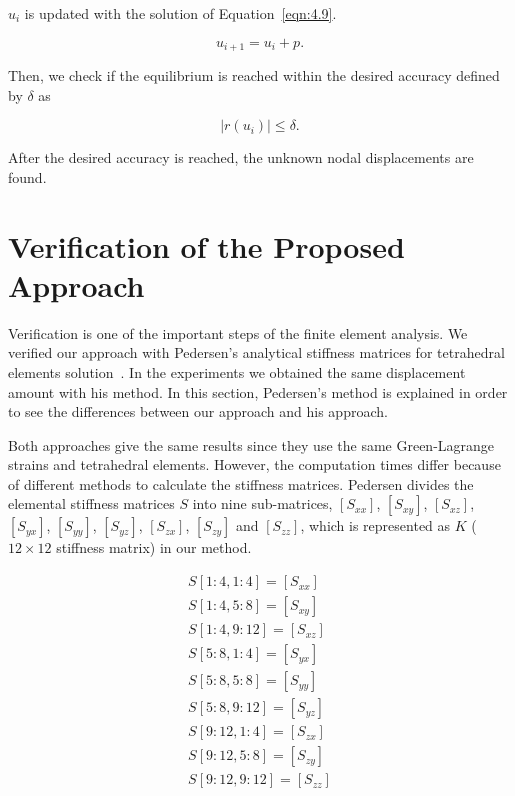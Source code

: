 \noindent $u_{i}$ is updated with the solution of Equation~\ref{eqn:4.9}.

\begin{equation}
u_{i+1} = u_{i} + p.
\label{eqn:4.10}
\end{equation}

\noindent Then, we check if the equilibrium is reached within the desired accuracy defined by $\delta$ as

\begin{equation}
|r(u_{i})| \le \delta.
\label{eqn:4.11}
\end{equation}

\noindent After the desired accuracy is reached, the unknown nodal displacements are found.

\section{Verification of the Proposed Approach}

Verification is one of the important steps of the finite element analysis. We verified our approach with Pedersen's analytical stiffness matrices for tetrahedral elements solution~\cite{Pedersen06}. In the experiments we obtained the same displacement amount with his method. In this section, Pedersen's method is explained in order to see the differences between our approach and his approach.

Both approaches give the same results since they use the same Green-Lagrange strains and tetrahedral elements. However, the computation times differ because of different methods to calculate the stiffness matrices. Pedersen divides the elemental stiffness matrices $S$ into nine sub-matrices, $[S_{xx}]$, $[S_{xy}]$, $[S_{xz}]$, $[S_{yx}]$, $[S_{yy}]$, $[S_{yz}]$, $[S_{zx}]$, $[S_{zy}]$ and $[S_{zz}]$, which is represented as $K$ ($12 \times 12$ stiffness matrix) in our method.

\begin{equation}
\begin{array}{l}
S[1:4,1:4] = [S_{xx}] \\
S[1:4,5:8] = [S_{xy}] \\
S[1:4,9:12] = [S_{xz}] \\
S[5:8,1:4] = [S_{yx}] \\
S[5:8,5:8] = [S_{yy}] \\
S[5:8,9:12] = [S_{yz}] \\
S[9:12,1:4] = [S_{zx}] \\
S[9:12,5:8] = [S_{zy}] \\
S[9:12,9:12] = [S_{zz}]
\end{array}
\label{eqn:4.12}
\end{equation}

